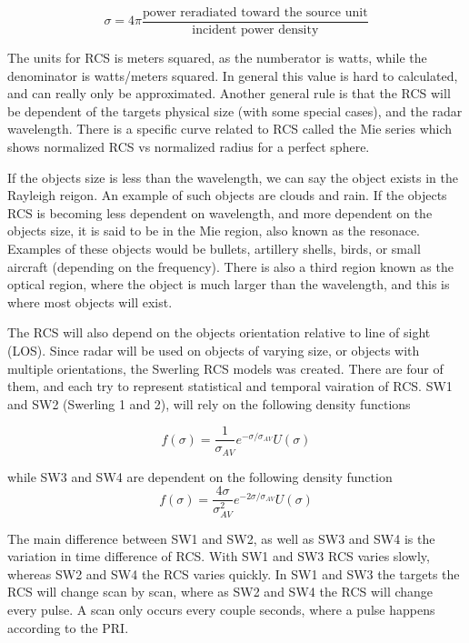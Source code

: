 \documentclass[12pt]{article}
\begin{document}
\begin{equation}
    \sigma = 4 \pi \frac{ \mbox{power reradiated toward the source unit} }{ \mbox{incident power density}}
\end{equation}

The units for RCS is meters squared, as the numberator is watts, while the denominator is watts/meters squared. In general this value is hard to calculated, and can really only be approximated. Another general rule is that the RCS will be dependent of the targets physical size (with some special cases), and the radar wavelength. There is a specific curve related to RCS called the Mie series which shows normalized RCS vs normalized radius for a perfect sphere. 

If the objects size is less than the wavelength, we can say the object exists in the Rayleigh reigon. An example of such objects are clouds and rain. If the objects RCS is becoming less dependent on wavelength, and more dependent on the objects size, it is said to be in the Mie region, also known as the resonace. Examples of these objects would be bullets, artillery shells, birds, or small aircraft (depending on the frequency). There is also a third region known as the optical region, where the object is much larger than the wavelength, and this is where most objects will exist. 

The RCS will also depend on the objects orientation relative to line of sight (LOS). Since radar will be used on objects of varying size, or objects with multiple orientations, the Swerling RCS models was created. There are four of them, and each try to represent statistical and temporal vairation of RCS. SW1 and SW2 (Swerling 1 and 2), will rely on the following density functions

\begin{equation}
    f (\sigma) = \frac{1}{\sigma_{AV}} e^{-\sigma / \sigma_{AV}} U(\sigma)
\end{equation}

while SW3 and SW4 are dependent on the following density function
\begin{equation}
    f (\sigma) = \frac{4 \sigma}{\sigma^2_{AV}} e^{-2\sigma / \sigma_{AV}} U(\sigma)
\end{equation}

The main difference between SW1 and SW2, as well as SW3 and SW4 is the variation in time difference of RCS. With SW1 and SW3 RCS varies slowly, whereas SW2 and SW4 the RCS varies quickly. In SW1 and SW3 the targets the RCS will change scan by scan, where as SW2 and SW4 the RCS will change every pulse. A scan only occurs every couple seconds, where a pulse happens according to the PRI.
\end{document}

